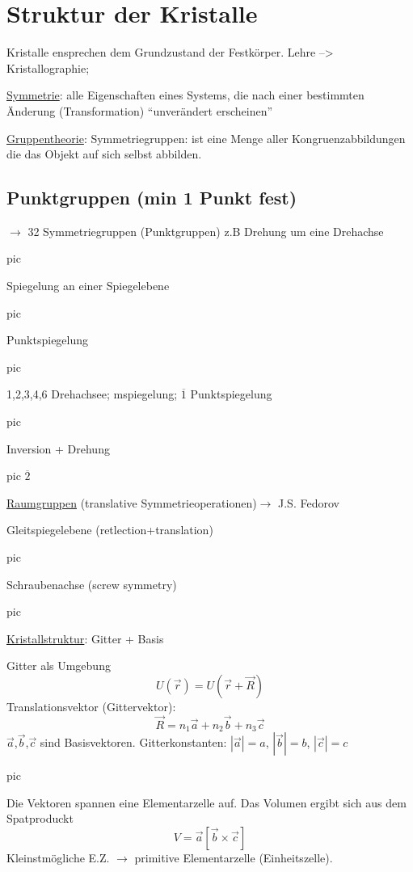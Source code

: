 \chapter{Struktur der Kristalle}

Kristalle ensprechen dem Grundzustand der Festkörper. Lehre --> Kristallographie;

\underline{Symmetrie}: alle Eigenschaften eines Systems, die nach einer bestimmten
Änderung (Transformation) ``unverändert erscheinen''

\underline{Gruppentheorie}:
Symmetriegruppen: ist eine Menge aller Kongruenzabbildungen die das Objekt auf
sich selbst abbilden.





\section{Punktgruppen (min 1 Punkt fest)}
\(\rightarrow\) 32 Symmetriegruppen (Punktgruppen)
z.B Drehung um eine Drehachse

pic

Spiegelung an einer Spiegelebene


pic

Punktspiegelung

pic


1,2,3,4,6 Drehachsee;
mspiegelung;
\(\overline 1\) Punktspiegelung

pic

Inversion + Drehung

pic \(\overline 2\)

\underline{Raumgruppen} (translative Symmetrieoperationen)\(\rightarrow\) J.S. Fedorov 

Gleitspiegelebene (retlection+translation)

pic

Schraubenachse (screw symmetry)

pic


\underline{Kristallstruktur}: Gitter + Basis

Gitter als Umgebung 
\[U(\vec r)=U(\vec r +\vec R)\]
Translationsvektor (Gittervektor):
\[ \vec R = n_1\vec a+ n_2\vec b+ n_3\vec c\]
\(\vec a\),\(\vec b\),\(\vec c\) sind Basisvektoren. Gitterkonstanten: \(|\vec a|=a\),
\(|\vec b|=b\), \(|\vec c|=c\)

pic

Die Vektoren spannen eine Elementarzelle auf. Das Volumen ergibt sich aus dem Spatproduckt
\[ V=\vec a [\vec b \times \vec c] \]
Kleinstmögliche E.Z. \(\rightarrow\) primitive Elementarzelle (Einheitszelle).

